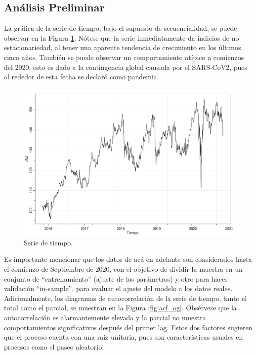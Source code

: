 \documentclass[conference]{IEEEtran}
\begin{document}
\subsection{Análisis Preliminar}
La gráfica de la serie de tiempo, bajo el supuesto de secuencialidad, se puede observar en la Figura \ref{fig:ts}. Nótese que la serie inmediatamente da indicios de no estacionariedad, al tener una aparente tendencia de crecimiento en los últimos cinco años. También se puede observar un comportamiento atípico a comienzos del 2020, esto es dado a la contingencia global causada por el SARS-CoV2, pues al rededor de esta fecha se declaró como pandemia.

\begin{figure}
    \centering
    \includegraphics[width=\columnwidth]{figs/ts.pdf}
    \caption{Serie de tiempo.}
    \label{fig:ts}
\end{figure}

Es importante mencionar que los datos de acá en adelante son considerados hasta el comienzo de Septiembre de 2020, con el objetivo de dividir la muestra en un conjunto de ``entrenamiento'' (ajuste de los parámetros) y otro para hacer validación ``in-sample'', para evaluar el ajuste del modelo a los datos reales. Adicionalmente, los diagramas de autocorrelación de la serie de tiempo, tanto el total como el parcial, se muestran en la Figura \ref{fig:acf_og}. Obsérvese que la autocorrelación es alarmantemente elevada y la parcial no muestra comportamientos significativos después del primer lag. Estos dos factores sugieren que el proceso cuenta con una raíz unitaria, pues son características usuales en procesos como el paseo aleatorio.
\end{document}
